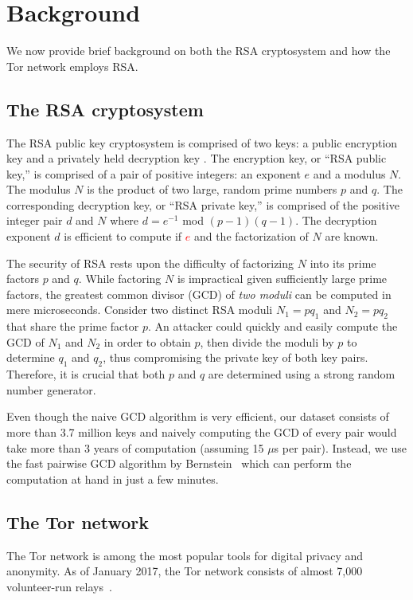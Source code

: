 \section{Background}
\label{sec:background}
We now provide brief background on both the RSA cryptosystem and how the Tor
network employs RSA.

\subsection{The RSA cryptosystem}
The RSA public key cryptosystem is comprised of two keys: a public encryption
key and a privately held decryption key \cite{rivest1978}. The encryption key, or ``RSA public
key,'' is comprised of a pair of positive integers: an exponent $e$ and a modulus
$N$. The modulus $N$ is the product of two large, random prime numbers $p$ and
$q$. The corresponding decryption key, or ``RSA private key,'' is comprised of the
positive integer pair $d$ and $N$ where $d = e^{-1}$ mod $(p - 1)(q - 1)$.  The
decryption exponent $d$ is efficient to compute if \textcolor{red}{$e$} and the factorization of $N$ 
are known.

The security of RSA rests upon the difficulty of factorizing $N$ into its prime
factors $p$ and $q$.  While factoring $N$ is impractical given sufficiently
large prime factors, the greatest common divisor (GCD) of \emph{two moduli} can
be computed in mere microseconds.  Consider two distinct RSA moduli $N_1 = pq_1$
and $N_2 = pq_2$ that share the prime factor $p$.  An attacker could quickly and
easily compute the GCD of $N_1$ and $N_2$ in order to obtain $p$, then divide
the moduli by $p$ to determine $q_1$ and $q_2$, thus compromising the private
key of both key pairs.  Therefore, it is crucial that both $p$ and $q$ are
determined using a strong random number generator.

Even though the naive GCD algorithm is very efficient, our dataset consists of
more than 3.7 million keys and naively computing the GCD of every pair would
take more than 3 years of computation (assuming 15 $\mu$s per pair). Instead,
we use the fast pairwise GCD algorithm by Bernstein~\cite{Bernstein04} which
can perform the computation at hand in just a few minutes.

\subsection{The Tor network}
The Tor network is among the most popular tools for digital privacy and
anonymity. As of January 2017, the Tor network consists of almost 7,000
volunteer-run relays~\cite{tormetrics}.

